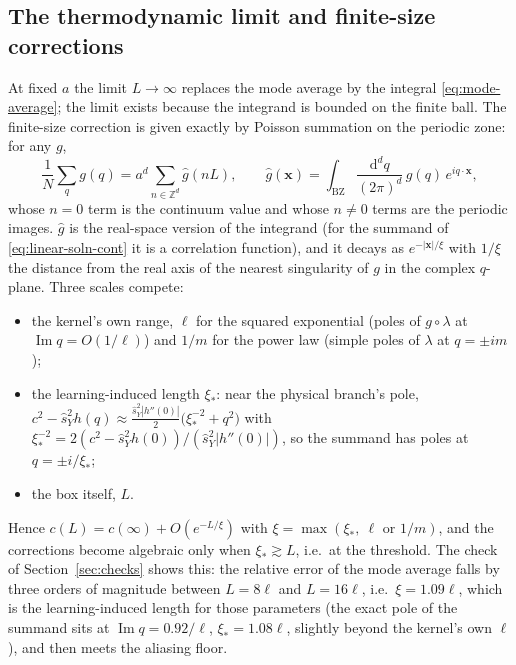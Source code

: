 \documentclass[11pt,a4paper]{article}
\newcommand{\Z}{\mathbb Z}
\newcommand{\dd}{\mathrm d}
\newcommand{\sY}{\hat s_Y}
\begin{document}
\subsection{The thermodynamic limit and finite-size corrections}
\label{sec:finite-size}
At fixed $a$ the limit $L\to\infty$ replaces the mode average by the integral \eqref{eq:mode-average}; the limit exists because the integrand is bounded on the finite ball. The finite-size correction is given exactly by Poisson summation on the periodic zone: for any $g$,
\begin{equation}
  \frac1N\sum_q g(q) = a^d\sum_{n\in\Z^d}\hat g(nL),
  \qquad
  \hat g(\mathbf x) = \int_{\mathrm{BZ}}\frac{\dd^dq}{(2\pi)^d}\,g(q)\,e^{iq\cdot\mathbf x},
  \label{eq:poisson}
\end{equation}
whose $n=0$ term is the continuum value and whose $n\neq0$ terms are the periodic images. $\hat g$ is the real-space version of the integrand (for the summand of \eqref{eq:linear-soln-cont} it is a correlation function), and it decays as $e^{-|\mathbf x|/\xi}$ with $1/\xi$ the distance from the real axis of the nearest singularity of $g$ in the complex $q$-plane. Three scales compete:
\begin{itemize}
  \item the kernel's own range, $\ell$ for the squared exponential (poles of $g\circ\lambda$ at $\operatorname{Im}q = O(1/\ell)$) and $1/m$ for the power law (simple poles of $\lambda$ at $q = \pm im$);
  \item the learning-induced length $\xi_*$: near the physical branch's pole, $c^2-\sY^2h(q)\approx\frac{\sY^2|h''(0)|}{2}\big(\xi_*^{-2}+q^2\big)$ with $\xi_*^{-2} = 2(c^2-\sY^2h(0))/(\sY^2|h''(0)|)$, so the summand has poles at $q = \pm i/\xi_*$;
  \item the box itself, $L$.
\end{itemize}
Hence $c(L) = c(\infty) + O(e^{-L/\xi})$ with $\xi = \max(\xi_*,\ \ell\text{ or }1/m)$, and the corrections become algebraic only when $\xi_*\gtrsim L$, i.e.\ at the threshold. The check of Section~\ref{sec:checks} shows this: the relative error of the mode average falls by three orders of magnitude between $L = 8\ell$ and $L = 16\ell$, i.e.\ $\xi = 1.09\ell$, which is the learning-induced length for those parameters (the exact pole of the summand sits at $\operatorname{Im}q = 0.92/\ell$, $\xi_* = 1.08\ell$, slightly beyond the kernel's own $\ell$), and then meets the aliasing floor.
\end{document}
